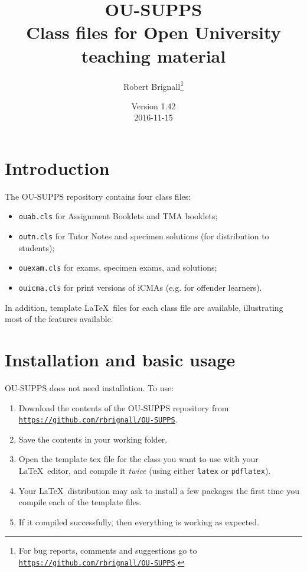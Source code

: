 \documentclass[a4paper]{ltxguide}
\title{\textsf{OU-SUPPS}\\Class files for Open University teaching material}
\author{Robert Brignall\footnote{For bug reports, comments and
suggestions go to \href{https://github.com/rbrignall/OU-SUPPS}%
{\texttt{https://github.com/rbrignall/OU-SUPPS}}.}}
\date{Version 1.42\\2016-11-15}
\newcommand\3{\unskip\enspace\fbox{\fontsize{4}{4}\selectfont NEW 3.0}}
\begin{document}
\maketitle

\tableofcontents

\section{Introduction}

The \textsf{OU-SUPPS} repository contains four class files:
\begin{itemize}
\item \texttt{ouab.cls} for Assignment Booklets and TMA booklets;
\item \texttt{outn.cls} for Tutor Notes and specimen solutions (for distribution to students);
\item \texttt{ouexam.cls} for exams, specimen exams, and solutions;
\item \texttt{ouicma.cls} for print versions of iCMAs (e.g. for offender learners).
\end{itemize}

In addition, template \LaTeX\ files for each class file are available, illustrating most of the features available.

\section{Installation and basic usage}

\textsf{OU-SUPPS} does not need installation. To use:

\begin{enumerate}
\item Download the contents of the \textsf{OU-SUPPS} repository from \href{https://github.com/rbrignall/OU-SUPPS}%
{\texttt{https://github.com/rbrignall/OU-SUPPS}}.
\item Save the contents in your working folder.
\item Open the template tex file for the class you want to use with your \LaTeX\ editor, and compile it \emph{twice} (using either \texttt{latex} or \texttt{pdflatex}). 
\item Your \LaTeX\ distribution may ask to install a few packages the first time you compile each of the template files.
\item If it compiled successfully, then everything is working as expected.
\end{enumerate}
\end{document}
